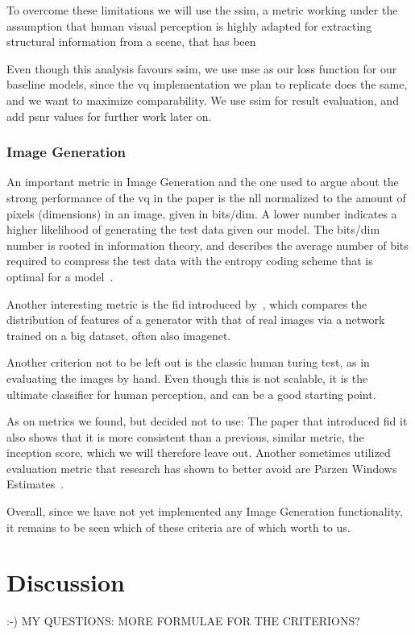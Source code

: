 \documentclass[10pt,a4paper,twoside]{article}
\begin{document}
    To overcome these limitations we will use the \ac{ssim}, a metric working under the assumption that human visual
    perception is highly adapted for extracting structural information from a scene, that has been

    Even though this analysis favours \ac{ssim}, we use \ac{mse} as our loss function for our baseline models,
    since the \ac{vq} implementation we plan to replicate does the same, and we want to maximize comparability.
    We use \ac{ssim} for result evaluation, and add \ac{psnr} values for further work later on.


    \subsubsection{Image Generation}
    An important metric in Image Generation and the one used to argue about the strong performance of the \ac{vq} in the
    paper is the \ac{nll} normalized to the amount of pixels (dimensions) in an image, given in bits/dim.
    A lower number indicates a higher likelihood of generating the test data given our model.
    The bits/dim number is rooted in information theory, and describes the average number of bits required to
    compress the test data with the entropy coding scheme that is optimal for a model~\cite{shannon}.

    Another interesting metric is the \ac{fid} introduced by~\cite{fid}, which compares the distribution of features of
    a generator with that of real images via a network trained on a big dataset, often also imagenet.

    Another criterion not to be left out is the classic human turing test, as in evaluating the images by hand.
    Even though this is not scalable, it is the ultimate classifier for human perception, and can be a good starting
    point.

    As on metrics we found, but decided not to use: The paper that introduced \ac{fid} it also shows that it is more
    consistent than a previous, similar metric, the inception score, which we will therefore leave out.
    Another sometimes utilized evaluation metric that research has shown to better avoid are Parzen Windows Estimates~\cite{note_on_eval}.

    Overall, since we have not yet implemented any Image Generation functionality, it remains to be seen which of these
    criteria are of which worth to us.

    \section{Discussion}
    :-)
    MY QUESTIONS: MORE FORMULAE FOR THE CRITERIONS?
    
\end{document}
